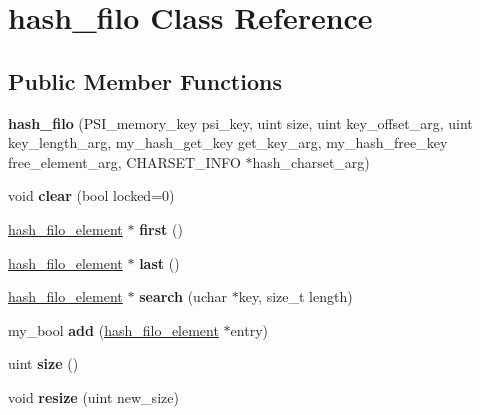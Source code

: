 \hypertarget{classhash__filo}{}\section{hash\+\_\+filo Class Reference}
\label{classhash__filo}
\subsection*{Public Member Functions}
\begin{DoxyCompactItemize}
\item 
\mbox{\label{classhash__filo_af50c062fac8efe8a431fe7260e11b153}} 
{\bfseries hash\+\_\+filo} (P\+S\+I\+\_\+memory\+\_\+key psi\+\_\+key, uint size, uint key\+\_\+offset\+\_\+arg, uint key\+\_\+length\+\_\+arg, my\+\_\+hash\+\_\+get\+\_\+key get\+\_\+key\+\_\+arg, my\+\_\+hash\+\_\+free\+\_\+key free\+\_\+element\+\_\+arg, C\+H\+A\+R\+S\+E\+T\+\_\+\+I\+N\+FO $\ast$hash\+\_\+charset\+\_\+arg)
\item 
\mbox{\label{classhash__filo_a3793f2def195980ff258c558350b3c2f}} 
void {\bfseries clear} (bool locked=0)
\item 
\mbox{\label{classhash__filo_a2da8af4f45afef8140670928f9f94ae0}} 
\mbox{\hyperlink{structhash__filo__element}{hash\+\_\+filo\+\_\+element}} $\ast$ {\bfseries first} ()
\item 
\mbox{\label{classhash__filo_aeb7ef57893adac9213ab951526e3f540}} 
\mbox{\hyperlink{structhash__filo__element}{hash\+\_\+filo\+\_\+element}} $\ast$ {\bfseries last} ()
\item 
\mbox{\label{classhash__filo_a323d78eead83273a0adb38f364e84211}} 
\mbox{\hyperlink{structhash__filo__element}{hash\+\_\+filo\+\_\+element}} $\ast$ {\bfseries search} (uchar $\ast$key, size\+\_\+t length)
\item 
\mbox{\label{classhash__filo_af2e87494bfc6874d6db4ff12ba276856}} 
my\+\_\+bool {\bfseries add} (\mbox{\hyperlink{structhash__filo__element}{hash\+\_\+filo\+\_\+element}} $\ast$entry)
\item 
\mbox{\label{classhash__filo_a94e08c5b22f4753366dc636a3d3715b8}} 
uint {\bfseries size} ()
\item 
\mbox{\label{classhash__filo_a3d0e8723cd44c7956fbf21eb0f907ad2}} 
void {\bfseries resize} (uint new\+\_\+size)
\end{DoxyCompactItemize}
